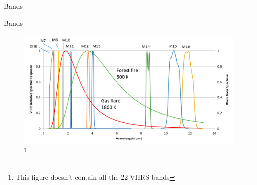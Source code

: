 \documentclass[aspectratio=169]{beamer} %
\begin{document}
\begin{frame}{Bands}
\end{frame}

\begin{frame}{Bands}
  \begin{figure}
    \includegraphics[width=0.75\linewidth]{viirsbands2.png}
    \footnote{This figure doesn't contain all the 22 VIIRS bands}
  \end{figure}
\end{frame}
\end{document}
